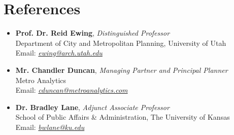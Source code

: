 \section{ \textbf{ References}}
    \begin{itemize}[leftmargin=0.15in]
        \item[] \textbf{Prof. Dr. Reid Ewing}, \emph{Distinguished Professor} \\
        Department of City and Metropolitan Planning, University of Utah \\
        Email: \href{mailto:ewing@arch.utah.edu}{\textit{ewing@arch.utah.edu}}
        \item[] \textbf{Mr. Chandler Duncan}, \emph{Managing Partner and Principal Planner} \\
        Metro Analytics \\ 
        Email: \href{mailto:cduncan@metroanalytics.com}{\textit{cduncan@metroanalytics.com}}
        \item[] \textbf{Dr. Bradley Lane}, \emph{Adjunct Associate Professor} \\
        School of Public Affairs \& Administration, The University of Kansas \\
        Email: \href{mailto:bwlane@ku.edu}{\textit{bwlane@ku.edu}}
    \end{itemize}